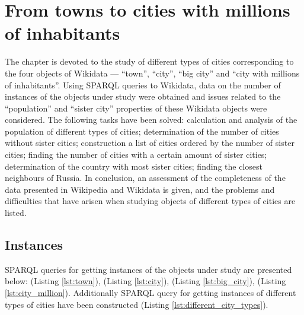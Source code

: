 \setchapterpreamble[u]{\margintoc}
\chapter{From towns to cities with millions of inhabitants\protect\footnotemark}


The chapter is devoted to the study of different types of cities corresponding to the four objects of Wikidata — ``town'', ``city'', ``big city'' and ``city with millions of inhabitants''. Using SPARQL queries to Wikidata, data on the number of instances of the objects under study were obtained and issues related to the ``population'' and ``sister city'' properties of these Wikidata objects were considered. The following tasks have been solved: calculation and analysis of the population of different types of cities; determination of the number of cities without sister cities; construction a list of cities ordered by the number of sister cities; finding the number of cities with a certain amount of sister cities; determination of the country with most sister cities; finding the closest neighbours of Russia. In conclusion, an assessment of the completeness of the data presented in Wikipedia and Wikidata is given, and the problems and difficulties that have arisen when studying objects of different types of cities are listed.

\section{Instances}

SPARQL queries for getting instances of the objects under study are presented below:  (Listing \ref{lst:town}),  (Listing \ref{lst:city}),  (Listing \ref{lst:big_city}),  (Listing \ref{lst:city_million}). Additionally SPARQL query for getting instances of different types of cities have been constructed (Listing \ref{lst:different_city_types}).


